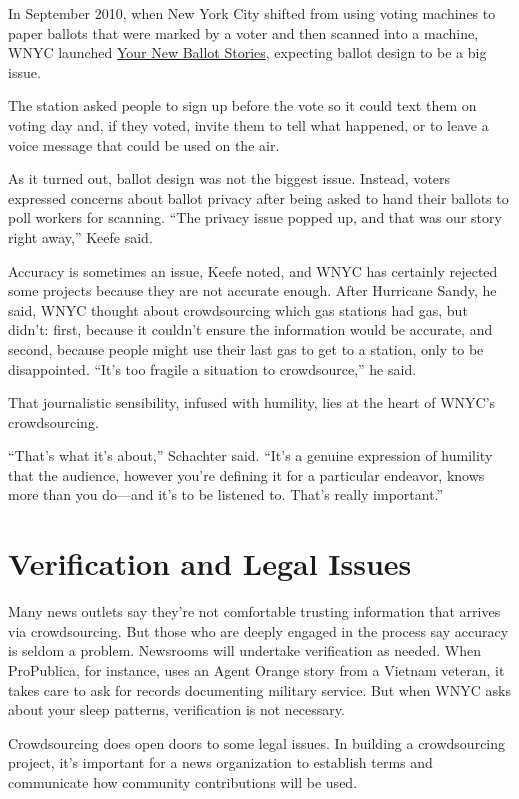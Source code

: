 \begin{itemize}
\begin{itemize}
In September 2010, when New York City shifted from using voting machines to paper ballots that were marked by a voter and then scanned into a machine, WNYC launched \href{http://www.wnyc.org/story/94305-text-ballot-your-primary-day-reports/}{Your New Ballot Stories}, expecting ballot 
design to be a big issue.\autocite{Ballot} 

The station asked people to sign up before the vote so it could text them on voting day and, if they voted, invite them to tell what happened, or to leave a voice message that could be used on the air. 

As it turned out, ballot design was not the biggest issue. Instead, voters expressed concerns about ballot privacy after being asked to hand their ballots to poll workers for scanning. ``The privacy issue popped up, and that was our story right away,'' Keefe said.

Accuracy is sometimes an issue, Keefe noted, and WNYC has certainly rejected some projects because they are not accurate enough. After Hurricane Sandy, he said, WNYC thought about crowdsourcing which gas stations had gas, but didn’t: first, because it couldn’t ensure the information would be accurate, and second, because people might use their last gas to get to a station, only to be disappointed. ``It’s too fragile a situation to crowdsource,'' he said. 

That journalistic sensibility, infused with humility, lies at the heart of WNYC’s crowdsourcing.

``That’s what it’s about,'' Schachter said. ``It’s a genuine expression of humility that the audience, however you’re defining it for a particular endeavor, knows more than you do---and it’s to be listened to. That’s really important.''

\chapter{Verification and Legal Issues}

Many news outlets say they’re not comfortable trusting information that arrives via crowdsourcing. But those who are deeply engaged in the process say accuracy is seldom a problem. Newsrooms will undertake verification as needed. When ProPublica, for instance, uses an Agent Orange story from a Vietnam veteran, it takes care to ask for records documenting military service. But when WNYC asks about your sleep patterns, verification is not necessary.

Crowdsourcing does open doors to some legal issues. In building a crowdsourcing project, it’s important for a news organization to establish terms and communicate how community contributions will be used. 


\end{itemize}
\end{itemize}
